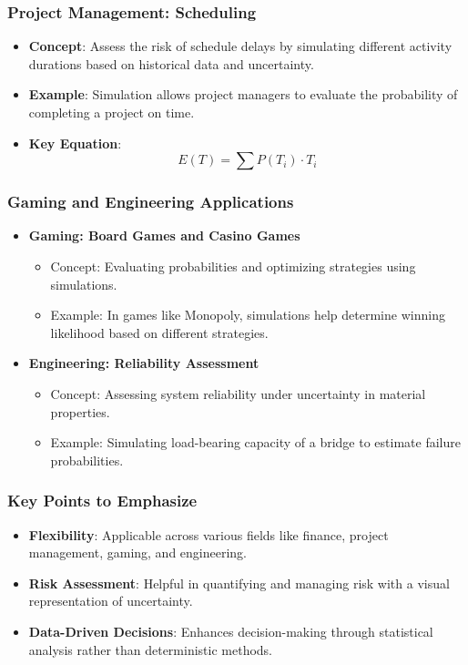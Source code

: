 \documentclass[aspectratio=169]{beamer}
\begin{document}
\begin{frame}[fragile]
    \frametitle{Project Management: Scheduling}

    \begin{itemize}
        \item \textbf{Concept}: Assess the risk of schedule delays by simulating different activity durations based on historical data and uncertainty.
        \item \textbf{Example}: Simulation allows project managers to evaluate the probability of completing a project on time.
        \item \textbf{Key Equation}:
        \begin{equation}
            E(T) = \sum P(T_i) \cdot T_i
        \end{equation}
    \end{itemize}
\end{frame}

\begin{frame}[fragile]
    \frametitle{Gaming and Engineering Applications}

    \begin{itemize}
        \item \textbf{Gaming: Board Games and Casino Games}
          \begin{itemize}
              \item Concept: Evaluating probabilities and optimizing strategies using simulations.
              \item Example: In games like Monopoly, simulations help determine winning likelihood based on different strategies.
          \end{itemize}
        \item \textbf{Engineering: Reliability Assessment}
          \begin{itemize}
              \item Concept: Assessing system reliability under uncertainty in material properties.
              \item Example: Simulating load-bearing capacity of a bridge to estimate failure probabilities.
          \end{itemize}
    \end{itemize}
\end{frame}

\begin{frame}[fragile]
    \frametitle{Key Points to Emphasize}

    \begin{itemize}
        \item \textbf{Flexibility}: Applicable across various fields like finance, project management, gaming, and engineering.
        \item \textbf{Risk Assessment}: Helpful in quantifying and managing risk with a visual representation of uncertainty.
        \item \textbf{Data-Driven Decisions}: Enhances decision-making through statistical analysis rather than deterministic methods.
    \end{itemize}
\end{frame}
\end{document}
